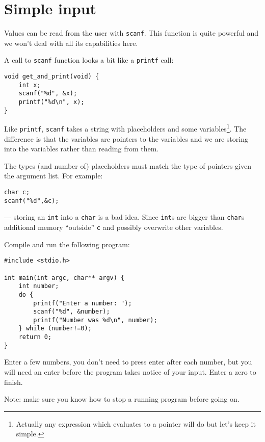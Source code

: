 
\chapter{Simple input}


Values can be read from the user with \texttt{scanf}.
This function is quite powerful and we won't deal with all its capabilities here.

A  call to \texttt{scanf} function looks a bit like a \texttt{printf} call:
\begin{lstlisting}
void get_and_print(void) {
    int x;
    scanf("%d", &x);
    printf("%d\n", x);
}
\end{lstlisting}
Like \texttt{printf}, \texttt{scanf} takes a string with placeholders and some variables\footnote{Actually any expression which evaluates to a pointer will do but let's keep it simple.}.
The difference is that the variables are pointers to the variables and we are storing into the variables
rather than reading from them.

The types (and number of) placeholders must match the type of pointers given the argument list.
For example:
\begin{lstlisting}
char c;
scanf("%d",&c); 
\end{lstlisting}
--- storing an \texttt{int} into a \texttt{char} is a bad idea.
Since \texttt{int}s are bigger than \texttt{char}s additional memory ``outside'' \texttt{c} and possibly overwrite 
other variables.

Compile and run the following program:
\begin{lstlisting}
#include <stdio.h>

int main(int argc, char** argv) {
    int number;
    do {
        printf("Enter a number: "); 
        scanf("%d", &number);
        printf("Number was %d\n", number);
    } while (number!=0);
    return 0;
}
\end{lstlisting}
Enter a few numbers, you don't need to press enter after each number, but you will need an enter before the program 
takes notice of your input.
Enter a zero to finish.

Note: make sure you know how to stop a running program before going on.

